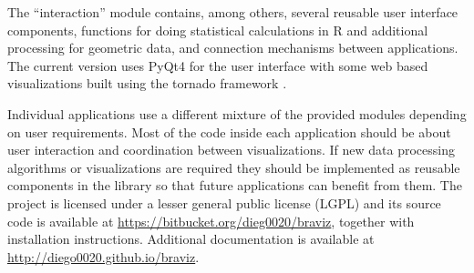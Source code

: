 The ``interaction'' module contains, among others, several reusable user interface components, functions for doing statistical calculations in R\cite{team_r:_2012}\cite{gautier_rpy2:_2008} and additional processing for geometric data, and connection mechanisms between applications. The current version uses PyQt4 for the user interface with some web based visualizations built using the tornado framework \cite{server_source_2008}. 

Individual applications use a different mixture of the provided modules depending on user requirements. Most of the code inside each application should be about user interaction and coordination between visualizations. If new data processing algorithms or visualizations are required they should be implemented as reusable components in the library so that future applications can benefit from them. The project is licensed under a lesser general public license (LGPL) and its source code is available at \url{https://bitbucket.org/dieg0020/braviz}, together with installation instructions. Additional documentation is available at \url{http://diego0020.github.io/braviz}.